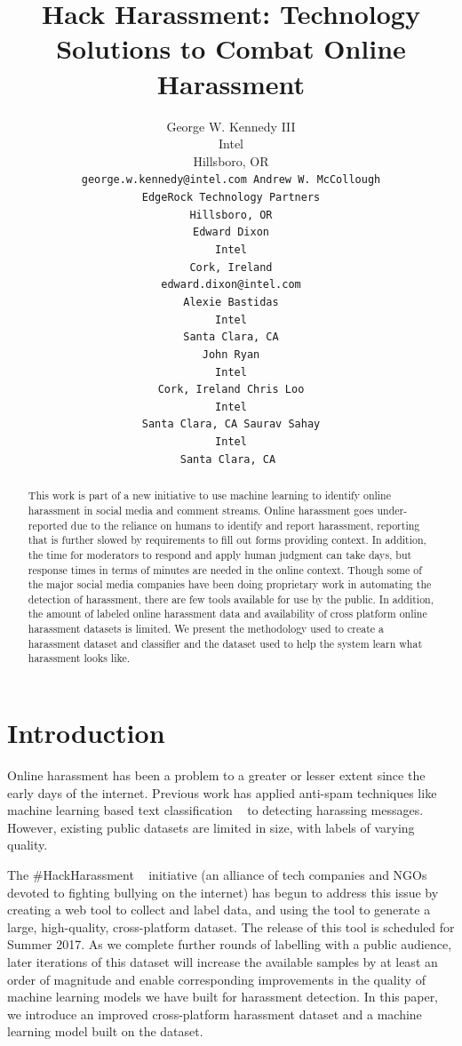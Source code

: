 \documentclass[11pt,a4paper]{article}
\title{Hack Harassment: Technology Solutions to Combat Online Harassment}
\author{George W. Kennedy III \\ Intel \\ Hillsboro, OR \\ \tt {george.w.kennedy@intel.com} \And Andrew W. McCollough \\ EdgeRock Technology Partners\\ Hillsboro, OR \\ \AND Edward Dixon \\ Intel \\ Cork, Ireland \\ \tt {edward.dixon@intel.com} \\ \And Alexie Bastidas \\ Intel \\ Santa Clara, CA \\ \And John Ryan \\ Intel \\ Cork, Ireland \And Chris Loo \\ Intel \\ Santa Clara, CA  \And Saurav Sahay \\ Intel \\ Santa Clara, CA }
\date{}
\begin{document}
\maketitle
\begin{abstract}
  This work is part of a new initiative to use machine
  learning to identify online harassment in social media
  and comment streams. Online harassment goes
  under-reported due to the reliance on humans to
  identify and report harassment, reporting that is further
  slowed by requirements to fill out forms
  providing context. In addition, the time for moderators
  to respond and apply human judgment can
  take days, but response times in terms of minutes
  are needed in the online context. Though some of
  the major social media companies have been doing
  proprietary work in automating the detection of
  harassment, there are few tools available for use by
  the public. In addition, the amount of labeled online
  harassment data and availability of cross platform
  online harassment datasets is limited. We present
  the methodology used to create a harassment dataset
  and classifier and the dataset used to help the
  system learn what harassment looks like.

\end{abstract}

\section{Introduction}

Online harassment has been a problem to a greater
or lesser extent since the early days of the internet.
Previous work has applied anti-spam techniques
like machine learning based text classification 
~\cite{Reynolds:2011} to
detecting harassing messages. However, existing
public datasets are limited in size, with labels of
varying quality.

The \#HackHarassment ~\cite{HH:2017} initiative 
(an alliance of tech companies and
NGOs devoted to fighting bullying on the internet)
has begun to address this issue by creating a web
tool to collect and label data, and using the tool to
generate a large, high-quality, cross-platform dataset.
The release of this tool is scheduled for Summer
2017. As we complete further rounds of labelling
with a public audience, later iterations of this dataset
will increase the available samples by at least
an order of magnitude and enable corresponding
improvements in the quality of machine learning
models we have built for harassment detection. In
this paper, we introduce an improved cross-platform
harassment dataset and a machine learning
model built on the dataset.
\end{document}
